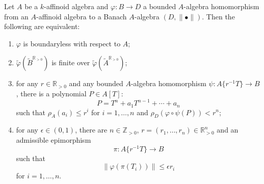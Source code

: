 \begin{proposition}\label{prop-innerhomochar}
    Let $A$ be a $k$-affinoid algebra and $\varphi:B\rightarrow D$ a bounded $A$-algebra homomorphism from an $A$-affinoid algebra to a Banach $A$-algebra $(D,\|\bullet\|)$. Then the following are equivalent:
    \begin{enumerate}
        \item $\varphi$ is boundaryless with respect to $A$;
        \item $\tilde{\varphi}(\tilde{B}^{\mathbb{R}_{>0}})$ is finite over $\tilde{\varphi}(\tilde{A}^{\mathbb{R}_{>0}})$;
        \item for any $r\in \mathbb{R}_{>0}$ and any bounded $A$-algebra homomorphism $\psi:A\{r^{-1}T\}\rightarrow B$, there is a polynomial $P\in A[T]$: 
        \[
            P=T^n+a_1T^{n-1}+\cdots+a_n    
        \]
        such that $\rho_A(a_i)\leq r^i$ for $i=1,\ldots,n$ and $\rho_D(\varphi\circ \psi(P))<r^n$;
        \item for any $\epsilon\in (0,1)$, there are $n\in \mathbb{Z}_{>0}$, $r=(r_1,\ldots,r_n)\in \mathbb{R}^n_{>0}$ and an admissible epimorphism
        \[
            \pi: A\{r^{-1}T\}\rightarrow B    
        \] 
        such that 
        \[
            \|\varphi(\pi(T_i))\|\leq \epsilon r_i  
        \]
        for $i=1,\ldots,n$.
        
        
    \end{enumerate}
\end{proposition}
